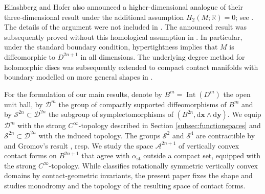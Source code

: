 \documentclass{amsart}
\theoremstyle{definition}
\newcommand{\AAA}{\mathcal A}
\newcommand{\rmd}{\mathrm d}
\newcommand{\DD}{\mathcal D}
\newcommand{\R}{\mathbb R}
\renewcommand{\SS}{\mathcal S}
\newcommand{\bfx}{\mathbf x}
\newcommand{\bfy}{\mathbf y}
\DeclareMathOperator{\Int}{\mathrm{Int}}
\DeclareMathOperator{\st}{\mathrm{st}}
\begin{document}
Eliashberg and Hofer also announced
a higher-dimensional analogue
of their three-dimensional result
under the additional assumption
$H_2(M;\R)=0$;
see \cite[p.\ 1305, Item~2]{eh94}.
The details of the argument
were not included in \cite{eh94}.
The announced result was subsequently proved
without this homological assumption
in \cite[Theorem~1]{gz16b}.
In particular,
under the standard boundary condition,
hypertightness implies that
$M$ is diffeomorphic to $D^{2n+1}$
in all dimensions.
The underlying degree method
for holomorphic discs
was subsequently extended
to compact contact manifolds with boundary
modelled on more general shapes
in \cite{bschz19,beck23,kwz22}.

For the formulation of our main results,
denote by $B^m=\Int(D^m)$
the open unit ball,
by $\DD^m$ the group of compactly supported
diffeomorphisms of $B^m$
and by $\SS^{2n}\subset\DD^{2n}$
the subgroup of symplectomorphisms of
$(B^{2n},\rmd\bfx\wedge\rmd\bfy)$.
We equip $\DD^m$ with the strong
$C^{\infty}$-topology described in
Section \ref{subsec:functionspaces}
and $\SS^{2n}\subset\DD^{2n}$
with the induced topology.
The groups $\SS^2$ and $\SS^4$
are contractible by
\cite[Theorem~1.8]{agz22}
and Gromov's result \cite{grom85}, resp.
We study the space $\AAA^{2n+1}$
of vertically convex contact forms
on $B^{2n+1}$
that agree with $\alpha_{\st}$
outside a compact set,
equipped with the strong $C^{\infty}$-topology.
While \cite{efz} classifies rotationally symmetric
vertically convex domains
by contact-geometric invariants,
the present paper fixes the shape
and studies monodromy and the topology
of the resulting space of contact forms.
\end{document}
